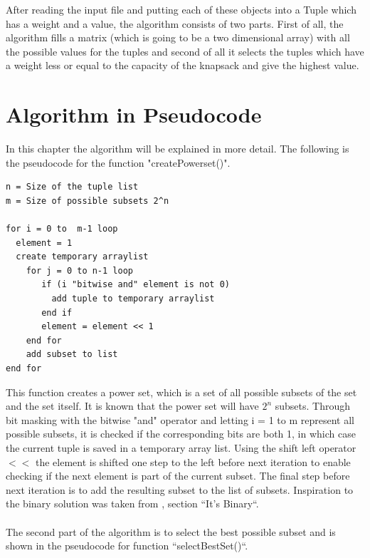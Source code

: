 \documentclass{inc/mas}
\begin{document}
After reading the input file and putting each of these objects into a Tuple which has a weight and a value, the algorithm consists of two parts. First of all, the algorithm fills a matrix (which is going to be a two dimensional array) with all the possible values for the tuples and second of all it selects the tuples which have a weight less or equal to the capacity of the knapsack and give the highest value. \\ 
 

\section{Algorithm in Pseudocode}
In this chapter the algorithm will be explained in more detail. The following is the pseudocode for the function "createPowerset()". \newline

\begin{lstlisting}
n = Size of the tuple list 	
m = Size of possible subsets 2^n

for i = 0 to  m-1 loop
  element = 1  
  create temporary arraylist  
    for j = 0 to n-1 loop
       if (i "bitwise and" element is not 0)
         add tuple to temporary arraylist
       end if
       element = element << 1
    end for
    add subset to list
end for
\end{lstlisting}

\noindent This function creates a power set, which is a set of all possible subsets of the set and the set itself. It is known that the power set will have $2^n$ subsets. Through bit masking with the bitwise "and" operator and letting i = 1 to m represent all possible subsets, it is checked if the corresponding bits are both 1, in which case the current tuple is saved in a temporary array list. Using the shift left operator $<<$ the element is shifted one step to the left before next iteration to enable checking if the next element is part of the current subset. The final step before next iteration is to add the resulting subset to the list of subsets. Inspiration to the binary solution was taken from \citep{powerset}, section ``It's Binary``. \\ \\ 

The second part of the algorithm is to select the best possible subset and is shown in the pseudocode for function ``selectBestSet()``.\\
\end{document}
